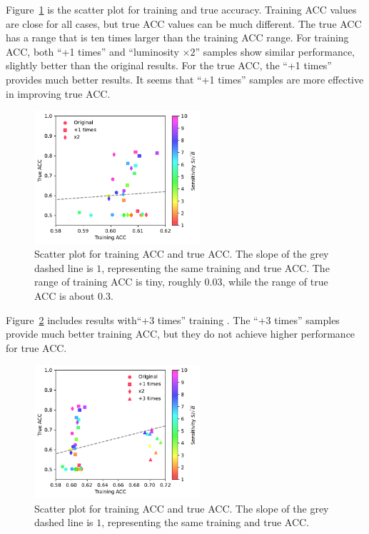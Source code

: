 \documentclass[12pt]{article}
\begin{document}
		Figure~\ref{fig:training_and_true_acc_ori_aug_1_x2} is the scatter plot for training and true accuracy. Training ACC values are close for all cases, but true ACC values can be much different. The true ACC has a range that is ten times larger than the training ACC range. For training ACC, both ``+1 times'' and ``luminosity $\times 2$'' samples show similar performance, slightly better than the original results. For the true ACC, the ``+1 times'' provides much better results. It seems that ``+1 times'' samples are more effective in improving true ACC.
		\begin{figure}[htpb]
			\centering
			\includegraphics[width=0.55\textwidth]{HVmodel_training_true_acc_aug_1_x2.pdf}
			\caption{Scatter plot for training ACC and true ACC. The slope of the grey dashed line is $1$, representing the same training and true ACC. The range of training ACC is tiny, roughly 0.03, while the range of true ACC is about 0.3.}
			\label{fig:training_and_true_acc_ori_aug_1_x2}
		\end{figure}

		Figure~\ref{fig:training_and_true_acc_ori_aug_1_3_x2} includes results with``+3 times'' training . The ``+3 times'' samples provide much better training ACC, but they do not achieve higher performance for true ACC.
		\begin{figure}[htpb]
			\centering
			\includegraphics[width=0.55\textwidth]{HVmodel_training_true_acc_aug_1_3_x2.pdf}
			\caption{Scatter plot for training ACC and true ACC. The slope of the grey dashed line is $1$, representing the same training and true ACC.}
			\label{fig:training_and_true_acc_ori_aug_1_3_x2}
		\end{figure}
\end{document}
